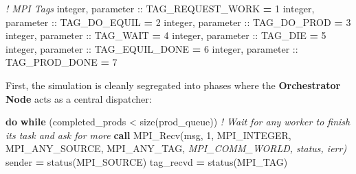 \documentclass[
]{article}
\newenvironment{Shaded}{}{}
\newcommand{\CommentTok}[1]{\textcolor[rgb]{0.38,0.63,0.69}{\textit{#1}}}
\newcommand{\DataTypeTok}[1]{\textcolor[rgb]{0.56,0.13,0.00}{#1}}
\newcommand{\DecValTok}[1]{\textcolor[rgb]{0.25,0.63,0.44}{#1}}
\newcommand{\FunctionTok}[1]{\textcolor[rgb]{0.02,0.16,0.49}{#1}}
\newcommand{\KeywordTok}[1]{\textcolor[rgb]{0.00,0.44,0.13}{\textbf{#1}}}
\newcommand{\NormalTok}[1]{#1}
\newcommand{\OperatorTok}[1]{\textcolor[rgb]{0.40,0.40,0.40}{#1}}
\begin{document}
\begin{Shaded}
\begin{Highlighting}[]
  \CommentTok{! MPI Tags}
  \DataTypeTok{integer}\NormalTok{, }\DataTypeTok{parameter} \DataTypeTok{::}\NormalTok{ TAG\_REQUEST\_WORK }\KeywordTok{=} \DecValTok{1}
  \DataTypeTok{integer}\NormalTok{, }\DataTypeTok{parameter} \DataTypeTok{::}\NormalTok{ TAG\_DO\_EQUIL     }\KeywordTok{=} \DecValTok{2}
  \DataTypeTok{integer}\NormalTok{, }\DataTypeTok{parameter} \DataTypeTok{::}\NormalTok{ TAG\_DO\_PROD      }\KeywordTok{=} \DecValTok{3}
  \DataTypeTok{integer}\NormalTok{, }\DataTypeTok{parameter} \DataTypeTok{::}\NormalTok{ TAG\_WAIT         }\KeywordTok{=} \DecValTok{4}
  \DataTypeTok{integer}\NormalTok{, }\DataTypeTok{parameter} \DataTypeTok{::}\NormalTok{ TAG\_DIE          }\KeywordTok{=} \DecValTok{5}
  \DataTypeTok{integer}\NormalTok{, }\DataTypeTok{parameter} \DataTypeTok{::}\NormalTok{ TAG\_EQUIL\_DONE   }\KeywordTok{=} \DecValTok{6}
  \DataTypeTok{integer}\NormalTok{, }\DataTypeTok{parameter} \DataTypeTok{::}\NormalTok{ TAG\_PROD\_DONE    }\KeywordTok{=} \DecValTok{7}
\end{Highlighting}
\end{Shaded}

First, the simulation is cleanly segregated into phases where the
\textbf{Orchestrator Node} acts as a central dispatcher:

\begin{Shaded}
\begin{Highlighting}[]
      \KeywordTok{do} \KeywordTok{while}\NormalTok{ (completed\_prods }\OperatorTok{\textless{}} \FunctionTok{size}\NormalTok{(prod\_queue))}
         \CommentTok{! Wait for any worker to finish its task and ask for more}
         \KeywordTok{call}\NormalTok{ MPI\_Recv(msg, }\DecValTok{1}\NormalTok{, MPI\_INTEGER, MPI\_ANY\_SOURCE, MPI\_ANY\_TAG,}\CommentTok{ MPI\_COMM\_WORLD, status, ierr)}
\NormalTok{         sender }\KeywordTok{=}\NormalTok{ status(MPI\_SOURCE)}
\NormalTok{         tag\_recvd }\KeywordTok{=}\NormalTok{ status(MPI\_TAG)}
\end{Highlighting}
\end{Shaded}
\end{document}
